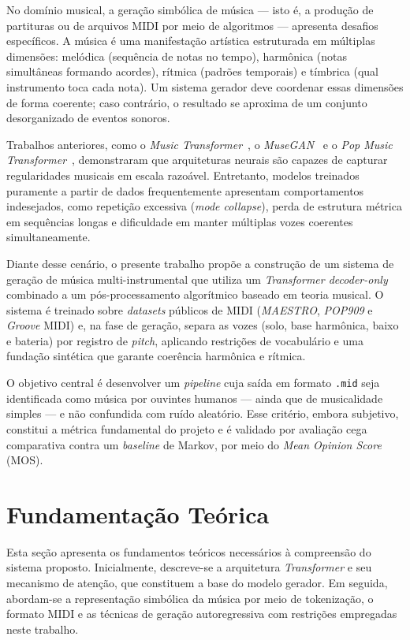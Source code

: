 \documentclass[12pt]{article}
\begin{document}
No domínio musical, a geração simbólica de música --- isto é, a produção de
partituras ou de arquivos MIDI por meio de algoritmos --- apresenta desafios
específicos. A música é uma manifestação artística estruturada em múltiplas
dimensões: melódica (sequência de notas no tempo), harmônica (notas simultâneas
formando acordes), rítmica (padrões temporais) e tímbrica (qual instrumento toca
cada nota). Um sistema gerador deve coordenar essas dimensões de forma coerente;
caso contrário, o resultado se aproxima de um conjunto desorganizado de eventos
sonoros.

Trabalhos anteriores, como o \emph{Music Transformer}~\cite{huang2018}, o
\emph{MuseGAN}~\cite{dong2018} e o \emph{Pop Music Transformer}~\cite{huang2020},
demonstraram que arquiteturas neurais são capazes de capturar regularidades
musicais em escala razoável. Entretanto, modelos treinados puramente a partir de
dados frequentemente apresentam comportamentos indesejados, como repetição
excessiva (\emph{mode collapse}), perda de estrutura métrica em sequências longas
e dificuldade em manter múltiplas vozes coerentes simultaneamente.

Diante desse cenário, o presente trabalho propõe a construção de um sistema de
geração de música multi-instrumental que utiliza um \emph{Transformer
decoder-only} combinado a um pós-processamento algorítmico baseado em teoria
musical. O sistema é treinado sobre \emph{datasets} públicos de MIDI (\emph{MAESTRO},
\emph{POP909} e \emph{Groove} MIDI) e, na fase de geração, separa as vozes (solo, base
harmônica, baixo e bateria) por registro de \emph{pitch}, aplicando restrições de
vocabulário e uma fundação sintética que garante coerência harmônica e rítmica.

O objetivo central é desenvolver um \emph{pipeline} cuja saída em formato
\texttt{.mid} seja identificada como música por ouvintes humanos --- ainda que de
musicalidade simples --- e não confundida com ruído aleatório. Esse critério,
embora subjetivo, constitui a métrica fundamental do projeto e é validado por
avaliação cega comparativa contra um \emph{baseline} de Markov, por meio do
\emph{Mean Opinion Score} (MOS).

\section{Fundamentação Teórica}

Esta seção apresenta os fundamentos teóricos necessários à compreensão do sistema
proposto. Inicialmente, descreve-se a arquitetura \emph{Transformer} e seu
mecanismo de atenção, que constituem a base do modelo gerador. Em seguida,
abordam-se a representação simbólica da música por meio de tokenização, o formato
MIDI e as técnicas de geração autoregressiva com restrições empregadas neste
trabalho.
\end{document}
